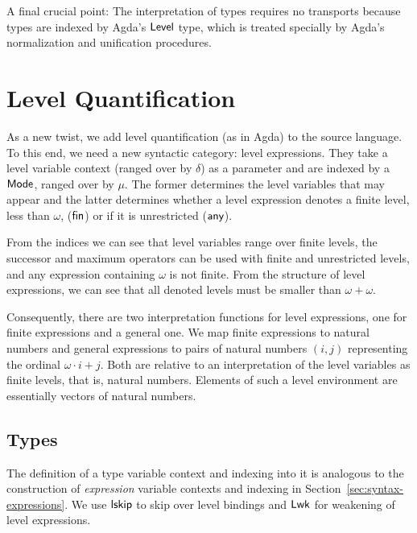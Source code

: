 \documentclass[manuscript,screen,review,anonymous]{acmart}
\begin{document}
{A final crucial point: The interpretation of types requires no transports because types are
indexed by Agda's $\ALevel$ type, which is treated 
specially by Agda's normalization and unification procedures.

\section{Level Quantification}
\label{sec:level-quantification}

As a new twist, we add level quantification (as in Agda) to the source
language. To this end, we need a new syntactic category: level
expressions. They take a level variable context {\IRLEnv} (ranged over
by $\delta$) as a parameter and are
indexed by a $\AMode$, ranged over by $\mu$. The former determines the
level variables that may appear and the latter determines whether a level
expression denotes a finite level, less than $\omega$, ($\Afin$) or if
it is unrestricted ($\Aany$).

\IRLvl

From the indices we can see that level variables range over finite
levels, the successor and maximum operators can be used with finite
and unrestricted levels, and any expression containing $\omega$ is not
finite. From the structure of level expressions, we can see that all
denoted levels must be smaller than $\omega + \omega$. 

Consequently, there are two interpretation functions for level
expressions, one for finite expressions and a general one. We map
finite expressions to natural numbers and general expressions to pairs of natural numbers $(i, j)$
representing the ordinal $\omega\cdot i + j$. 
Both are relative to an interpretation  of the level variables as
finite levels, that is, natural numbers. Elements of such a level
environment are essentially vectors of natural numbers.

\IRLEnvSem

\begin{minipage}{0.45\linewidth}
  \IRLSemFin
\end{minipage}
\begin{minipage}{0.45\linewidth}
  \IRLSemAny
\end{minipage}

\subsection{Types}
\label{sec:types}

The definition of a type variable context and indexing into it is
analogous to the construction of \emph{expression} variable contexts
and indexing in Section~\ref{sec:syntax-expressions}.  We use $\Alskip$ to skip
over level bindings and $\ALwk$ for weakening of level expressions.

}
\end{document}
